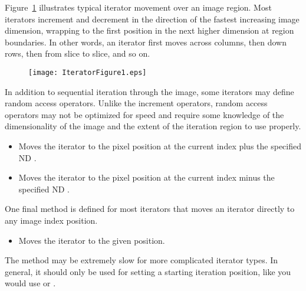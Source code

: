Figure~\ref{fig:WalkingIterator} illustrates typical iterator movement over
an image region.  Most iterators increment and decrement in the direction of
the fastest increasing image dimension, wrapping to the first position in the
next higher dimension at region boundaries.  In other words, an
iterator first moves across columns, then down rows, then from slice to slice,
and so on.

\begin{figure}
\centering
\texttt{[image: IteratorFigure1.eps]}
\protect\label{fig:WalkingIterator}
\end{figure}

In addition to sequential iteration through the image, some iterators may define
random access operators.  Unlike the increment operators, random access
operators may not be optimized for speed and require some knowledge of the
dimensionality of the image and the extent of the iteration region to use properly.

\begin{itemize}
\item \textbf{} Moves the iterator to the pixel
position at the current index plus the specified ND . 

\item \textbf{} Moves the iterator to the pixel
position at the current index minus the specified ND .
\end{itemize}

One final method is defined for most iterators that moves an iterator directly
to any image index position.

\begin{itemize}
\item \textbf{} Moves the iterator to the given
 position.
\end{itemize}

The  method may be extremely slow for more complicated
iterator types. In general, it should only be used for setting a starting
iteration position, like you would use  or .

